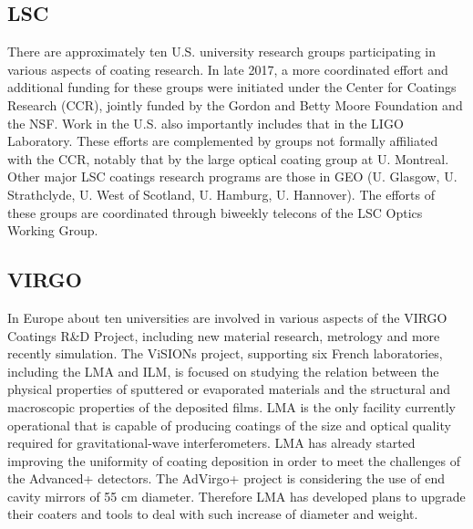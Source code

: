 \subsection{LSC}

There are approximately ten U.S. university research groups participating in various aspects of coating research. In late 2017, a more coordinated effort and additional funding for these groups were initiated under the Center for Coatings Research (CCR), jointly funded by the Gordon and Betty Moore Foundation and the NSF. Work in the U.S. also importantly includes that in the LIGO Laboratory. These efforts are complemented by groups not formally affiliated with the CCR, notably that by the large optical coating group at U. Montreal. Other major LSC coatings research programs are those in GEO (U. Glasgow, U. Strathclyde, U. West of Scotland, U. Hamburg, U. Hannover). The efforts of these groups are coordinated through biweekly telecons of the LSC Optics Working Group.

\subsection{VIRGO}

In Europe about ten universities are involved in various aspects of the VIRGO Coatings R\&D Project, including new material research, metrology and more recently simulation. The ViSIONs project, supporting six French laboratories, including the LMA and ILM, is focused on studying the relation between the physical properties of sputtered or evaporated materials and the structural and macroscopic properties of the deposited films. LMA is the only facility currently operational that is capable of producing coatings of the size and optical quality required for gravitational-wave interferometers. LMA has already started improving the uniformity of coating deposition in order to meet the challenges of the Advanced+ detectors. The AdVirgo+ project is considering the use of end cavity mirrors of 55 cm diameter. Therefore LMA has developed plans to upgrade their coaters and tools to deal with such increase of diameter and weight.

